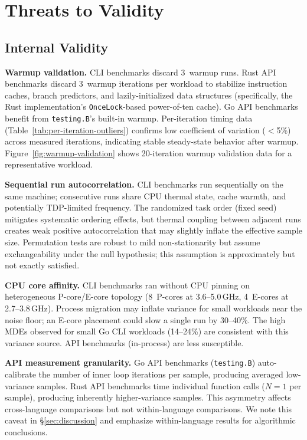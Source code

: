 \section{Threats to Validity}
\label{sec:threats}

\subsection{Internal Validity}

\textbf{Warmup validation.}
CLI benchmarks discard 3~warmup runs.  Rust API benchmarks discard
3~warmup iterations per workload to stabilize instruction caches,
branch predictors, and lazily-initialized data structures (specifically,
the Rust \burgerdybvig implementation's \texttt{OnceLock}-based
power-of-ten cache).  Go API benchmarks benefit from \texttt{testing.B}'s
built-in warmup.  Per-iteration timing data
(Table~\ref{tab:per-iteration-outliers}) confirms low coefficient of
variation ($<$5\%) across measured iterations, indicating stable
steady-state behavior after warmup.  Figure~\ref{fig:warmup-validation}
shows 20-iteration warmup validation data for a representative workload.



\textbf{Sequential run autocorrelation.}
CLI benchmarks run sequentially on the same machine; consecutive runs
share CPU thermal state, cache warmth, and potentially TDP-limited
frequency.  The randomized task order (fixed seed) mitigates systematic
ordering effects, but thermal coupling between adjacent runs creates
weak positive autocorrelation that may slightly inflate the effective
sample size.  Permutation tests are robust to mild non-stationarity but
assume exchangeability under the null hypothesis; this assumption is
approximately but not exactly satisfied.

\textbf{CPU core affinity.}
CLI benchmarks ran without CPU pinning on heterogeneous P-core/E-core
topology (8~P-cores at 3.6--5.0\,GHz, 4~E-cores at 2.7--3.8\,GHz).
Process migration may inflate variance for small workloads near the
noise floor; an E-core placement could slow a single run by 30--40\%.
The high MDEs observed for small Go CLI workloads (14--24\%) are
consistent with this variance source.  API benchmarks (in-process) are
less susceptible.

\textbf{API measurement granularity.}
Go API benchmarks (\texttt{testing.B}) auto-calibrate the number of
inner loop iterations per sample, producing averaged low-variance
samples.  Rust API benchmarks time individual function calls ($N{=}1$
per sample), producing inherently higher-variance samples.  This
asymmetry affects cross-language comparisons but not within-language
comparisons.  We note this caveat in \S\ref{sec:discussion} and
emphasize within-language results for algorithmic conclusions.

